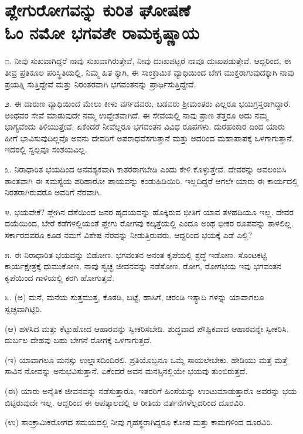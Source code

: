
\chapter{ಪ್ಲೇಗುರೋಗವನ್ನು ಕುರಿತ ಘೋಷಣೆ\\ಓಂ ನಮೋ ಭಗವತೇ ರಾಮಕೃಷ್ಣಾಯ}

೧. ನೀವು ಸುಖವಾಗಿದ್ದರೆ ನಾವು ಸುಖವಾಗಿರುತ್ತೇವೆ, ನೀವು ದುಃಖಪಟ್ಟರೆ ನಾವೂ ದುಃಖಪಡುತ್ತೇವೆ. ಆದ್ದರಿಂದ, ಈ ತೀವ್ರ ಪ್ರತಿಕೂಲ ಪರಿಸ್ಥಿತಿಯಲ್ಲಿ, ನಿಮ್ಮ ಹಿತ ಕ್ಕಾಗಿ, ಈ ಸಾಂಕ್ರಾಮಿಕ ವ್ಯಾಧಿಯಿಂದ ಬೇಗ ಮುಕ್ತರಾಗುವುದಕ್ಕಾಗಿ ನಾವು ಪ್ರಯತ್ನಿ ಸುತ್ತಿದ್ದೇವೆ ಮತ್ತು ನಿರಂತರವಾಗಿ ಭಗವಂತನನ್ನು ಪ್ರಾರ್ಥಿಸುತ್ತಿದ್ದೇವೆ.

೨. ಈ ದಾರುಣ ವ್ಯಾಧಿಯಿಂದ ಮೇಲು ಕೀಳು ವರ್ಗದವರು, ಬಡವರು ಶ‍್ರೀಮಂತರು ಎಲ್ಲರೂ ಭಯಗ್ರಸ್ತರಾಗಿದ್ದಾರೆ. ಅಂಥವರ ಸೇವೆ ಮಾಡುವುದೇ ನಮ್ಮ ಉದ್ದೇಶವಾಗಿದೆ. ಈ ಸೇವೆಯಲ್ಲಿ ನಾವು ಪ್ರಾಣ ತೆತ್ತರೂ ಅದು ನಮ್ಮ ಭಾಗ್ಯವೆಂದು ತಿಳಿಯುತ್ತೇವೆ. ಏಕೆಂದರೆ ನೀವೆಲ್ಲರೂ ಭಗವಂತನ ವಿವಿಧ ರೂಪಗಳು. ದುರಹಂಕಾರ ದಿಂದ ಯಾರು ಹೀಗೆ ಭಾವಿಸುವುದಿಲ್ಲವೊ ಅವನು ದೇವರಿಗೆ ಅಪರಾಧವೆಸಗುತ್ತಾನೆ ಮತ್ತು ಅದರಿಂದ ಮಹಾಪಾಪಕ್ಕೆ ಒಳಗಾಗುತ್ತಾನೆ. ಇದರಲ್ಲಿ ಸ್ವಲ್ಪವೂ ಸಂಶಯವಿಲ್ಲ.

೩. ನಿರಾಧಾರಿತ ಭಯದಿಂದ ಅನವಶ್ಯಕವಾಗಿ ಕಾತರರಾಗಬೇಡಿ ಎಂದು ಕೇಳಿ ಕೊಳ್ಳುತ್ತೇವೆ. ದೇವರನ್ನು ಅವಲಂಬಿಸಿ ಶಾಂತವಾಗಿ ಈ ಸಮಸ್ಯೆಯ ಪರಿಹಾರೋ ಪಾಯವನ್ನು ಕಂಡುಹಿಡಿಯಿರಿ. ಇಲ್ಲದಿದ್ದರೆ ಆಗಲೇ ಯಾರು ಈ ಕಾರ್ಯದಲ್ಲಿ ನಿರತರಾಗಿರುವರೊ ಅವರಿಗೆ ನೆರವಾಗಿ.

೪. ಭಯವೇಕೆ? ಪ್ಲೇಗಿನ ದೆಸೆಯಿಂದ ಜನರ ಹೃದಯವನ್ನು ಹೊಕ್ಕಿರುವ ಭೀತಿಗೆ ಯಾವ ತಳಹದಿಯೂ ಇಲ್ಲ. ದೇವರ ದಯೆಯಿಂದ, ಬೇರೆ ಕಡೆಗಳಲ್ಲಿಯಂತೆ ಪ್ಲೇಗು ರೋಗವು ಕಲ್ಕತ್ತೆಯಲ್ಲಿ ಎಂದೂ ಅಂಥ ಭೀಕರ ರೂಪವನ್ನು ತಾಳಲಿಲ್ಲ. ಸರ್ಕಾರದವರೂ ಕೂಡ ನಮಗೆ ವಿಶೇಷ ನೆರವನ್ನು ನೀಡುತ್ತಿರುವರು. ಆದ್ದರಿಂದ ಭಯಕ್ಕೆ ಎಡೆ ಎಲ್ಲಿ?

೫. ಈ ನಿರಾಧಾರಿತ ಭಯವನ್ನು ಬಿಡೋಣ. ಭಗವಂತನ ಅನಂತ ಕೃಪೆಯಲ್ಲಿ ಶ್ರದ್ಧೆ ಇಡೋಣ. ಸೊಂಟಕಟ್ಟಿ ಕಾರ್ಯಕ್ಷೇತ್ರಕ್ಕೆ ಧುಮುಕೋಣ. ನಾವು ಸ್ವಚ್ಛ ಜೀವನವನ್ನು ನಡೆಸೋಣ. ರೋಗ, ರೋಗಭಯ ಇವು ಭಗವಂತನ ಕೃಪೆಯಿಂದ ಗಾಳಿಯಲ್ಲಿ ಕರಗಿ ಹೋಗುತ್ತವೆ.

೬. (ಅ) ಮನೆ, ಮನೆಯ ಸುತ್ತಮುತ್ತ, ಕೊಠಡಿ, ಬಟ್ಟೆ, ಹಾಸಿಗೆ, ಚರಂಡಿ ಇತ್ಯಾದಿ ಗಳನ್ನು ಯಾವಾಗಲೂ ಸ್ವಚ್ಛವಾಗಿಟ್ಟಿರಿ.

(ಆ) ಹಳಸಿದ ಮತ್ತು ಕೆಟ್ಟುಹೋದ ಆಹಾರವನ್ನು ಸ್ವೀಕರಿಸಬೇಡಿ. ಶುದ್ಧವಾದ ಪೌಷ್ಟಿಕವಾದ ಆಹಾರವನ್ನೇ ಸ್ವೀಕರಿಸಿ. ದುರ್ಬಲ ದೇಹವು ಬಹು ಬೇಗನೆ ರೋಗಕ್ಕೆ ಒಳಗಾಗುತ್ತದೆ.

(ಇ) ಯಾವಾಗಲೂ ಮನಸ್ಸು ಉಲ್ಲಾಸದಿಂದಿರಲಿ. ಪ್ರತಿಯೊಬ್ಬನೂ ಒಮ್ಮೆ ಸಾಯಲೇಬೇಕು. ಹೇಡಿಯು ಮತ್ತೆ ಮತ್ತೆ ಸಾವಿನ ನೋವನ್ನು ಅನುಭವಿಸುತ್ತಾನೆ. ಏಕೆಂದರೆ ಅವನ ಮನಸ್ಸಿನಲ್ಲಿಯೇ ಭಯವು ತುಂಬಿರುತ್ತದೆ.

(ಈ) ಯಾರು ಅನೈತಿಕ ಜೀವನವನ್ನು ನಡೆಸುತ್ತಾರೊ, ಇತರರಿಗೆ ಹಿಂಸೆಯನ್ನು ಉಂಟುಮಾಡುತ್ತಾರೊ ಅವರನ್ನು ಭಯ ಬಿಟ್ಟಿರುವುದೇ ಇಲ್ಲ. ಆದ್ದರಿಂದ ಈ ಆಪತ್ಕಾಲದಲ್ಲಿ ಆ ರೀತಿಯ ವರ್ತನೆಗಳೆಲ್ಲದರಿಂದ ದೂರವಿರಿ.

(ಉ) ಸಾಂಕ್ರಾಮಿಕರೋಗದ ಸಮಯದಲ್ಲಿ ನೀವು ಗೃಹಸ್ಥರಾಗಿದ್ದರೂ ಕೋಪ ಮತ್ತು ಕಾಮಗಳಿಂದ ದೂರವಿರಿ.

